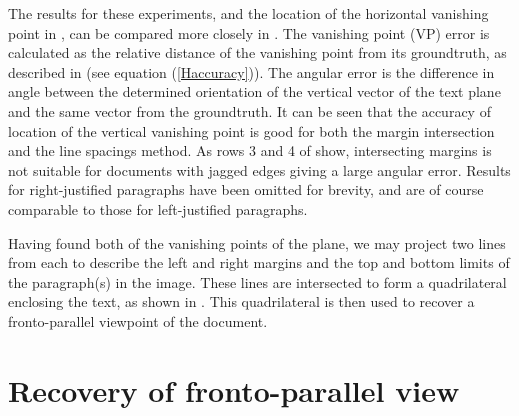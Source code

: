 The results for these experiments, and the location of the horizontal vanishing
point in , can be compared more closely in
. 
The vanishing point (VP) error is calculated as the relative distance of the
vanishing point from its groundtruth, as described in  (see equation (\ref{Haccuracy})). 
The angular error is the difference in angle between the determined orientation of the
vertical vector of the text plane and the same vector from the groundtruth.
It can be seen that the accuracy of location of the vertical vanishing point is
good for both the margin intersection and the line spacings method. 
As rows 3 and 4 of  show, intersecting margins is not
suitable for documents with jagged edges giving a large angular error.
Results for right-justified paragraphs have been omitted for brevity, and are of course comparable to those for left-justified paragraphs.


Having found both of the  vanishing points of the plane, we may project two lines from each
to describe the left and right margins and the top and bottom limits of the
paragraph(s) in the image. 
These lines are intersected to form a quadrilateral enclosing the text,
as shown in . %
This quadrilateral is then used to recover a fronto-parallel viewpoint
of the document.






\section{Recovery of fronto-parallel view} \label{sec-rectify}


